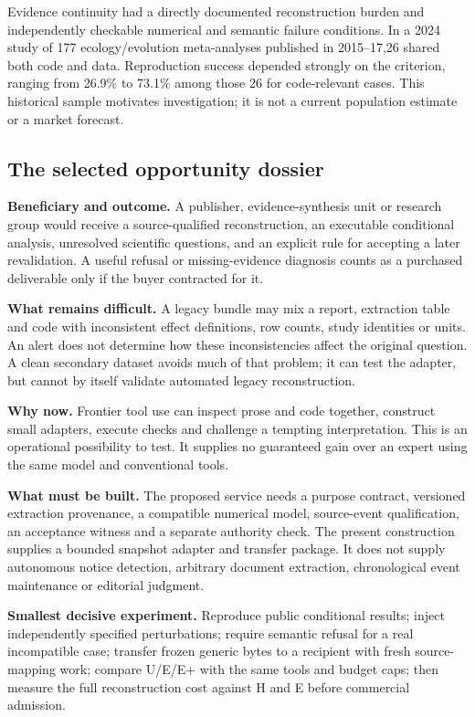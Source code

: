 Evidence continuity had a directly documented reconstruction burden and independently checkable numerical and semantic failure conditions. In a 2024 study of 177 ecology/evolution meta-analyses published in 2015–17,26 shared both code and data. Reproduction success depended strongly on the criterion, ranging from 26.9\% to 73.1\% among those 26 for code-relevant cases. This historical sample motivates investigation; it is not a current population estimate or a market forecast.\citep{kambouris}

\subsection{The selected opportunity dossier}

\textbf{Beneficiary and outcome.} A publisher, evidence-synthesis unit or research group would receive a source-qualified reconstruction, an executable conditional analysis, unresolved scientific questions, and an explicit rule for accepting a later revalidation. A useful refusal or missing-evidence diagnosis counts as a purchased deliverable only if the buyer contracted for it.

\textbf{What remains difficult.} A legacy bundle may mix a report, extraction table and code with inconsistent effect definitions, row counts, study identities or units. An alert does not determine how these inconsistencies affect the original question. A clean secondary dataset avoids much of that problem; it can test the adapter, but cannot by itself validate automated legacy reconstruction.

\textbf{Why now.} Frontier tool use can inspect prose and code together, construct small adapters, execute checks and challenge a tempting interpretation. This is an operational possibility to test. It supplies no guaranteed gain over an expert using the same model and conventional tools.

\textbf{What must be built.} The proposed service needs a purpose contract, versioned extraction provenance, a compatible numerical model, source-event qualification, an acceptance witness and a separate authority check. The present construction supplies a bounded snapshot adapter and transfer package. It does not supply autonomous notice detection, arbitrary document extraction, chronological event maintenance or editorial judgment.

\textbf{Smallest decisive experiment.} Reproduce public conditional results; inject independently specified perturbations; require semantic refusal for a real incompatible case; transfer frozen generic bytes to a recipient with fresh source-mapping work; compare U/E/E+ with the same tools and budget caps; then measure the full reconstruction cost against H and E before commercial admission.

